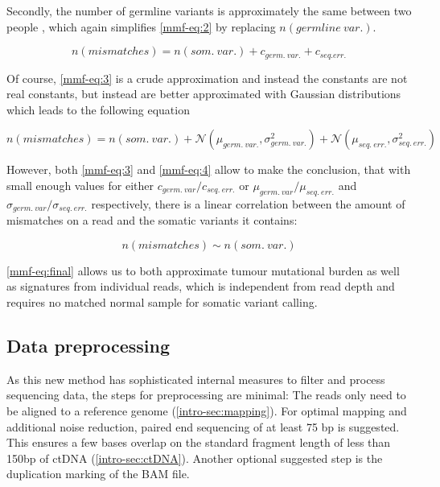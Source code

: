 Secondly, the number of germline variants is approximately the same between two people \cite{Auton2015}, which again simplifies \autoref{mmf-eq:2} by replacing $n(germline~var.)$.

\begin{equation}
n(mismatches) = n(som.~var.) + c_{germ.~var.} + c_{seq. err.}
\label{mmf-eq:3}
\end{equation}
\myequation[\ref{mmf-eq:3}]{MisMatchFinder: germline variants}

Of course, \autoref{mmf-eq:3} is a crude approximation and instead the constants are not real constants, but instead are better approximated with Gaussian distributions which leads to the following equation

\begin{equation}
n(mismatches) = n(som.~var.) + \mathcal{N}(\mu_{germ.~var.}, \sigma_{germ.~var.}^{2}) + \mathcal{N}(\mu_{seq.~err.}, \sigma_{seq.~err.}^{2})
\label{mmf-eq:4}
\end{equation}
\myequation[\ref{mmf-eq:3}]{MisMatchFinder: number of mismatches with distributions}

However, both \autoref{mmf-eq:3} and \ref{mmf-eq:4} allow to make the conclusion, that with small enough values for either $c_{germ.~var}/c_{seq.~err.}$ or $\mu_{germ.~var}/\mu_{seq.~err.}$ and $\sigma_{germ.~var}/\sigma_{seq.~err.}$ respectively, there is a linear correlation between the amount of mismatches on a read and the somatic variants it contains:

\begin{equation}
n(mismatches) \sim n(som.~var.)
\label{mmf-eq:final}
\end{equation}
\myequation[\ref{mmf-eq:3}]{MisMatchFinder: number of mismatches correlation with somatic variants}

\autoref{mmf-eq:final} allows us to both approximate tumour mutational burden as well as signatures from individual reads, which is independent from read depth and requires no matched normal sample for somatic variant calling.

\subsection{Data preprocessing}
As this new method has sophisticated internal measures to filter and process sequencing data, the steps for preprocessing are minimal: The reads only need to be aligned to a reference genome (\autoref{intro-sec:mapping}). For optimal mapping and additional noise reduction, paired end sequencing of at least 75 bp is suggested. This ensures a few bases overlap on the standard fragment length of less than 150bp of ctDNA (\autoref{intro-sec:ctDNA}). Another optional suggested step is the duplication marking of the BAM file.


